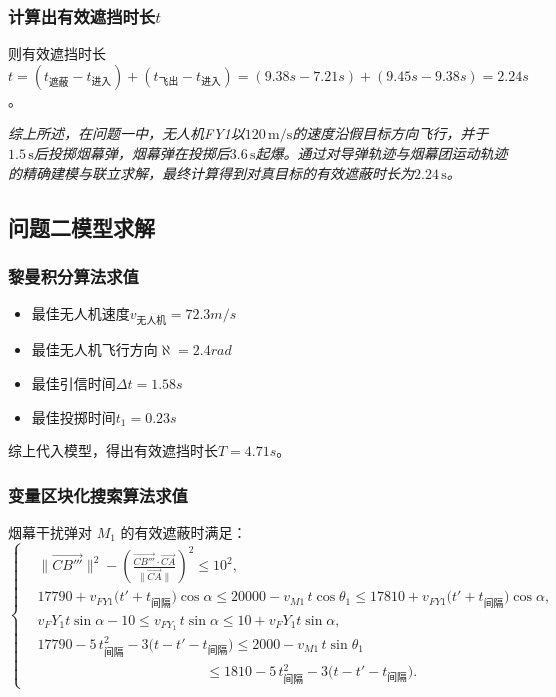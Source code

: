 \documentclass{article}
\begin{document}
\subsubsection{计算出有效遮挡时长$t$}
则有效遮挡时长$t =(t_\text{遮蔽}- t_\text{进入}) + (t_{\text{飞出}} - t_{\text{进入}}) = (9.38s - 7.21s) + (9.45s - 9.38s) = 2.24s$。

\textit{综上所述，在问题一中，无人机FY1以$120\,\mathrm{m/s}$的速度沿假目标方向飞行，并于$1.5\,\mathrm{s}$后投掷烟幕弹，烟幕弹在投掷后$3.6\,\mathrm{s}$起爆。通过对导弹轨迹与烟幕团运动轨迹的精确建模与联立求解，最终计算得到对真目标的有效遮蔽时长为$2.24\,\mathrm{s}$。}

\subsection{问题二模型求解}
\subsubsection{黎曼积分算法求值}
\begin{itemize}
    \item 最佳无人机速度$v_\text{无人机}=72.3m /s$
    \item 最佳无人机飞行方向$\aleph = 2.4rad$
    \item 最佳引信时间$\Delta t = 1.58s$
    \item 最佳投掷时间$t_1 = 0.23s$
\end{itemize}
综上代入模型，得出有效遮挡时长$T = 4.71s$。
\subsubsection{变量区块化搜索算法求值}
\begin{center}
烟幕干扰弹对 $M_1$ 的有效遮蔽时满足：
\[
\left\{
\begin{aligned}
&\bigl\|\overrightarrow{CB'''}\bigr\|^{2}
- \left(\frac{\overrightarrow{CB'''}\cdot\overrightarrow{CA}}{\|\overrightarrow{CA}\|}\right)^{2}
\le 10^{2}, \\[4pt]
&17790+v_{FY1}\bigl(t'+t_{\text{间隔}}\bigr)\cos\alpha
\le 20000 - v_{M1}\,t\cos\theta_1
\le 17810+v_{FY1}\bigl(t'+t_{\text{间隔}}\bigr)\cos\alpha, \\[4pt]
&v_FY_1 t \sin\alpha-10 \le v_{FY_1}\,t\sin\alpha \le 10+v_FY_1 t \sin \alpha
, \\[4pt]
&17790-5\,t_{\text{间隔}}^{2}-3\bigl(t-t'-t_{\text{间隔}}\bigr)
\le 2000 - v_{M1}\,t\sin\theta_1 \\ 
&\qquad\qquad\qquad\qquad\qquad\qquad
\le 1810-5\,t_{\text{间隔}}^{2}-3\bigl(t-t'-t_{\text{间隔}}\bigr).
\end{aligned}
\right.
\]
\end{center}
\end{document}

